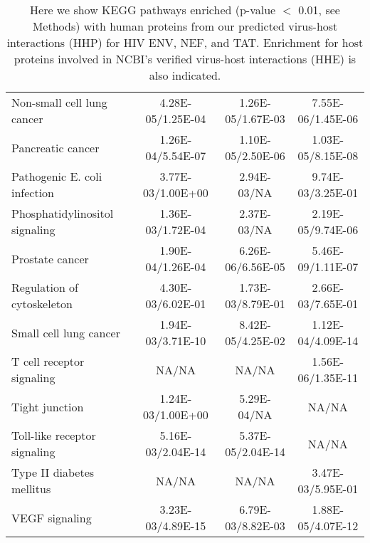 \begin{table}
\begin{center}
\begin{tabular}{|l|c|c|c|}
Non-small cell lung cancer & 4.28E-05/1.25E-04 & 1.26E-05/1.67E-03 & 7.55E-06/1.45E-06 \\
Pancreatic cancer & 1.26E-04/5.54E-07 & 1.10E-05/2.50E-06 & 1.03E-05/8.15E-08 \\
Pathogenic E. coli infection & 3.77E-03/1.00E+00 & 2.94E-03/NA & 9.74E-03/3.25E-01 \\
Phosphatidylinositol signaling & 1.36E-03/1.72E-04 & 2.37E-03/NA & 2.19E-05/9.74E-06 \\
Prostate cancer & 1.90E-04/1.26E-04 & 6.26E-06/6.56E-05 & 5.46E-09/1.11E-07 \\
Regulation of cytoskeleton & 4.30E-03/6.02E-01 & 1.73E-03/8.79E-01 & 2.66E-03/7.65E-01 \\
Small cell lung cancer & 1.94E-03/3.71E-10 & 8.42E-05/4.25E-02 & 1.12E-04/4.09E-14 \\
T cell receptor signaling & NA/NA & NA/NA & 1.56E-06/1.35E-11 \\
Tight junction & 1.24E-03/1.00E+00 & 5.29E-04/NA & NA/NA \\
Toll-like receptor signaling & 5.16E-03/2.04E-14 & 5.37E-05/2.04E-14 & NA/NA \\
Type II diabetes mellitus & NA/NA & NA/NA & 3.47E-03/5.95E-01 \\
VEGF signaling & 3.23E-03/4.89E-15 & 6.79E-03/8.82E-03 & 1.88E-05/4.07E-12 \\
\hline
  \end{tabular}
\end{center}
\caption[KEGG pathway enrichment for predicted and experimentally
  verified HIV targeted human proteins]{\small Here we show KEGG
  pathways enriched (p-value $<$ 0.01, see Methods) with human proteins
  from our predicted virus-host interactions (HHP) for HIV ENV, NEF,
  and TAT. Enrichment for host proteins involved in NCBI's verified
  virus-host interactions (HHE) is also
  indicated. \label{tbl:medGen1:KEGG}}
\end{table}
